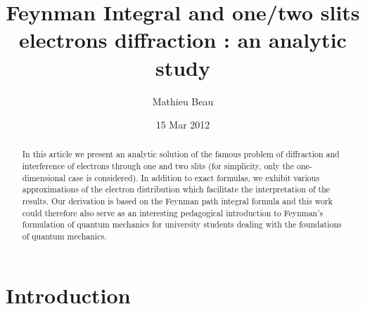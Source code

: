 \documentclass[12pt]{article}   %
\begin{document}
\title{Feynman Integral and one/two slits electrons diffraction : an analytic study}
\author{Mathieu Beau}

\date{15 Mar 2012}
\maketitle

\begin{abstract}

In this article we present an analytic solution of the famous
problem of diffraction and interference of electrons through one
and two slits (for simplicity, only the one-dimensional case is
considered). 
In addition to exact formulas, 
we exhibit various approximations of the electron
distribution which facilitate the interpretation of the results.
Our derivation is based on the Feynman path integral formula and
this work could therefore also serve as an interesting pedagogical
introduction to Feynman's  formulation of quantum mechanics for
university students dealing with the foundations of quantum
mechanics.
\end{abstract}



\section{Introduction}
\end{document}
